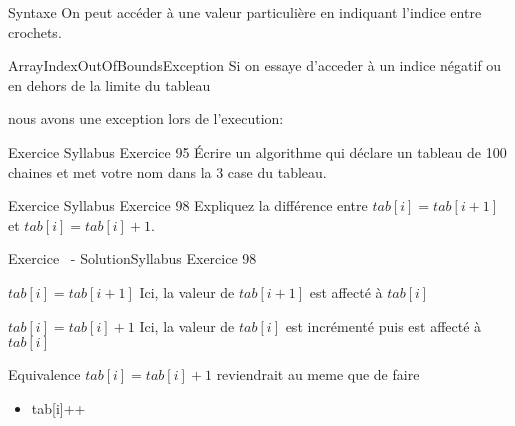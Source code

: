 \begin{frame}{Syntaxe}
    On peut accéder à une valeur particulière en indiquant l'indice entre crochets.
    
    \begin{alertblock}{ArrayIndexOutOfBoundsException}
        Si on essaye d'acceder à un indice négatif ou en dehors de la limite du tableau
        
        nous avons une exception lors de l'execution:
        
    \end{alertblock}

\end{frame}

\begin{frame}{Exercice \theexercice}{Syllabus Exercice 95}
    Écrire un algorithme qui déclare un tableau de 100 chaines
    et met votre nom dans la 3\ieme{} case du tableau.
\end{frame}

\begin{frame}{Exercice \theexercice}{Syllabus Exercice 98}
    Expliquez la différence entre $tab[i] = tab[i+1]$
    et $tab[i] = tab[i]+1$.
\end{frame}

\begin{frame}{Exercice \theexercice~- Solution}{Syllabus Exercice 98}
    \begin{block}{\textbf{$tab[i] = tab[i+1]$}}
        Ici, la valeur de $tab[i+1]$ est affecté à $tab[i]$
    \end{block}

    \begin{block}{\textbf{$tab[i] = tab[i]+1$}}
        Ici, la valeur de $tab[i]$ est incrémenté puis est affecté à $tab[i]$
    \end{block}

    \begin{exampleblock}{Equivalence}
        $tab[i] = tab[i]+1$ reviendrait au meme que de faire
        \begin{itemize}
            \item tab[i]++
        \end{itemize}
    \end{exampleblock}
\end{frame}